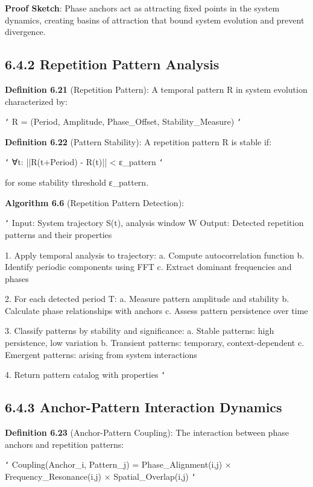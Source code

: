 \textbf{Proof Sketch}: Phase anchors act as attracting fixed points in the system dynamics, creating basins of attraction that bound system evolution and prevent divergence.

\subsection{6.4.2 Repetition Pattern Analysis}

\textbf{Definition 6.21} (Repetition Pattern): A temporal pattern R in system evolution characterized by:

\texttt{`}
R = (Period, Amplitude, Phase_Offset, Stability_Measure)
\texttt{`}

\textbf{Definition 6.22} (Pattern Stability): A repetition pattern R is stable if:

\texttt{`}
∀t: ||R(t+Period) - R(t)|| < ε_pattern
\texttt{`}

for some stability threshold ε_pattern.

\textbf{Algorithm 6.6} (Repetition Pattern Detection):

\texttt{`}
Input: System trajectory {S(t)}, analysis window W
Output: Detected repetition patterns and their properties

1. Apply temporal analysis to trajectory:
   a. Compute autocorrelation function
   b. Identify periodic components using FFT
   c. Extract dominant frequencies and phases
   
2. For each detected period T:
   a. Measure pattern amplitude and stability
   b. Calculate phase relationships with anchors
   c. Assess pattern persistence over time
   
3. Classify patterns by stability and significance:
   a. Stable patterns: high persistence, low variation
   b. Transient patterns: temporary, context-dependent
   c. Emergent patterns: arising from system interactions
   
4. Return pattern catalog with properties
\texttt{`}

\subsection{6.4.3 Anchor-Pattern Interaction Dynamics}

\textbf{Definition 6.23} (Anchor-Pattern Coupling): The interaction between phase anchors and repetition patterns:

\texttt{`}
Coupling(Anchor_i, Pattern_j) = Phase_Alignment(i,j) × Frequency_Resonance(i,j) × Spatial_Overlap(i,j)
\texttt{`}

